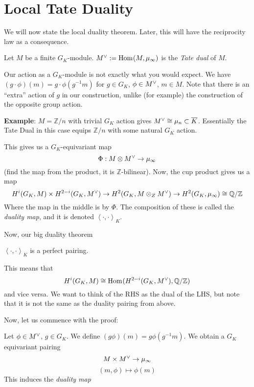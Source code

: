 \documentclass[class=article, crop=false]{standalone}
\begin{document}
\section{Local Tate Duality}

We will now state the local duality theorem. 
Later, this will have the reciprocity law as a consequence.

\begin{definition}
	Let \(M\) be a finite \(G_{K}\)-module. \(M^{\vee} :=
	\operatorname{Hom}_{} (M,\mu_{\infty})\) is the \textit{Tate dual} of \(M\).
\end{definition}

Our action as a \(G_{K}\)-module is not exactly what you would expect.
We have  \((g \cdot \phi)(m) = g \cdot \phi(g^{-1} m)\) for \(g \in G_{K}\),
\(\phi \in M^{\vee}\), \(m \in M\).
Note that there is an ``extra'' action of \(g\) in our construction,
unlike (for example) the construction of the opposite group action.

\textbf{Example}: $M=\mathbb{Z}/n$ with trivial $G_K$ action gives $M^\vee\cong \mu_{n}\subset \overline{K}$. Essentially the Tate Dual in this case equips $\mathbb{Z}/n$ with some natural $G_K$ action.

This gives us a \(G_{K}\)-equivariant map  
\[
\Phi : M \otimes M^{\vee} \to \mu_{\infty}
\] 
(find the map from the product, it is \(\mathbb{Z}\)-bilinear).
Now, the cup product gives us a map
\[
	H^{i}(G_{K},M) \times H^{2-i}(G_{K},M^{\vee})
	\to H^{2}(G_{K}, M \otimes_{Z} M^{\vee})
	\to H^{2}(G_{K}, \mu_{\infty})
	\cong \mathbb{Q} / \mathbb{Z}
\] 
Where the map in the middle is by \(\Phi\).
The composition of these is called the \textit{duality map}, and it is 
denoted \(\left<\cdot,\cdot \right>_{K}\).

Now, our big duality theorem

\begin{theorem}
	\(\left<\cdot,\cdot\right>_{K}\) is a perfect pairing.
\end{theorem}

This means that 
\[
	H^{i}(G_{K},M) \cong \operatorname{Hom}_{} (H^{2-i}(G_{K},M^{\vee}),\mathbb{Q} / \mathbb{Z})
\] 
and vice versa.
We want to think of the RHS as the dual of the LHS, but note that it 
is not the same as the duality pairing from above. 

Now, let us commence with the proof: 

Let $\phi \in M^\vee$, $g\in G_K$. We define $(g\phi)(m)=g\phi(g^{-1}m)$. 
\vskip 5pt 
\vskip 5pt
We obtain a $G_K$ equivariant pairing
\[M\times M^\vee \to \mu_{\infty}\]
\[(m, \phi) \mapsto \phi(m)\]
This induces the \textit{duality map}
\end{document}
